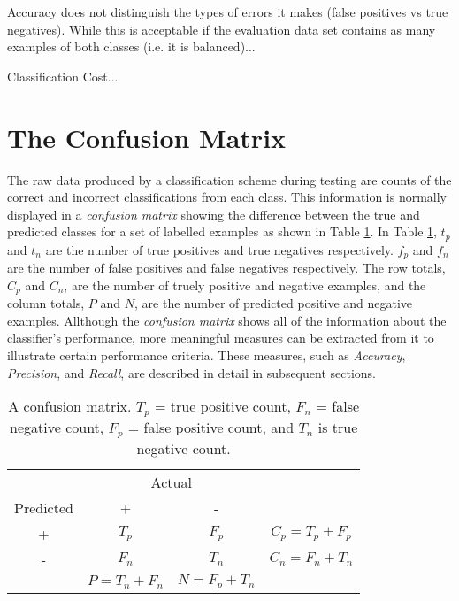 \documentclass[10pt]{unbthesis}
\begin{document}
Accuracy does not distinguish the types of errors it makes (false
positives vs true negatives). While this is acceptable if the evaluation
data set contains as many examples of both classes (i.e. it is
balanced)...

Classification Cost...

\section*{The Confusion Matrix}
The raw data produced by a classification scheme during testing are
counts of the correct and incorrect classifications from each
class. This information is normally displayed in a \textit{confusion
  matrix} showing the difference between the true and predicted
classes for a set of labelled examples as shown in Table
\ref{tab:confusionmatrix}. In Table \ref{tab:confusionmatrix}, \(t_p\)
and \(t_n\) are the number of true positives and true negatives
respectively. \(f_p\) and \(f_n\) are the number of false positives
and false negatives respectively. The row totals, \(C_p\) and \(C_n\),
are the number of truely positive and negative examples, and the
column totals, \(P\) and \(N\), are the number of predicted positive
and negative examples. Allthough the \textit{confusion matrix} shows
all of the information about the classifier's performance, more
meaningful measures can be extracted from it to illustrate certain
performance criteria. These measures, such as \textit{Accuracy},
\textit{Precision}, and \textit{Recall}, are described in detail in
subsequent sections.

\begin{table}
\centering
  \begin{tabular}{c|c|c|c}
    & \multicolumn{2}{|c|}{Actual} \\ \cline{1-3}
    Predicted & + & - & \\ \hline
    + & \(T_p\)           & \(F_p\)           & \(C_p = T_p + F_p\)  \\ \hline
    - & \(F_n\)           & \(T_n\)           & \(C_n = F_n + T_n\)  \\ \hline
    & \(P = T_n + F_n\) & \(N = F_p + T_n\) \\ \cline{2-3}
  \end{tabular}
  \caption{A confusion matrix. \(T_p\) = true positive count, \(F_n\)
  = false negative count, \(F_p\) = false positive count, and \(T_n\)
  is true negative count.}
  \label{tab:confusionmatrix}
\end{table}
\end{document}
